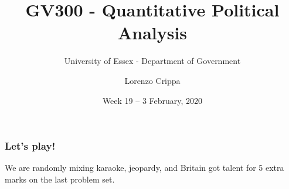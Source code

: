 \documentclass[xcolor=table,dvipsnames]{beamer}
\title{GV300 - Quantitative Political Analysis}
\subtitle{University of Essex - Department of Government}
\date{Week 19 -- 3 February, 2020}				%
\author{Lorenzo Crippa}
\begin{document}
\frame{
\titlepage
}



\begin{frame}
\frametitle{Let's play!}
\centering 
We are randomly mixing karaoke, jeopardy, and Britain got talent for 5 extra marks on the last problem set. 
\end{frame}
\end{document}
